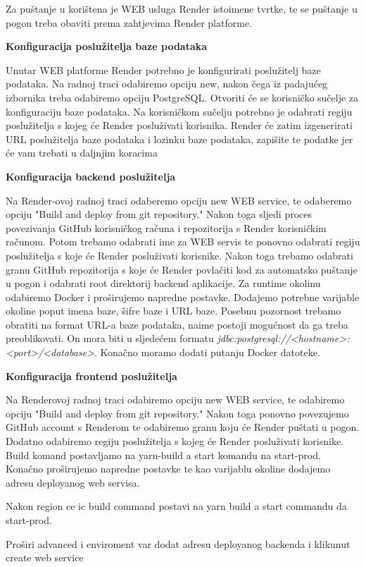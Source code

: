 			Za puštanje u korištena je WEB usluga Render istoimene tvrtke, te se puštanje u pogon treba obaviti prema zahtjevima Render platforme. 
			 	
			 \textbf{Konfiguracija poslužitelja baze podataka}
			 
			 Unutar WEB platforme Render potrebno je konfigurirati poslužitelj baze podataka. Na radnoj traci odabiremo opciju new, nakon čega iz padajućeg izbornika treba odabiremo opciju PostgreSQL. Otvoriti će se korisničko sučelje za konfiguraciju baze podataka. Na korisničkom sučelju potrebno je odabrati regiju poslužitelja s kojeg će Render posluživati korisnika. Render će zatim izgenerirati URL poslužitelja baze podataka i lozinku baze podataka, zapišite te podatke jer će vam trebati u daljnjim koracima  
			 
			 
			 	
			 \textbf{Konfiguracija backend poslužitelja}
			 
			 Na Render-ovoj radnoj traci odaberemo opciju new WEB service, te odaberemo opciju "Build and deploy from git repository." Nakon toga sljedi proces povezivanja GitHub korisničkog računa i repozitorija s Render korisničkim računom. Potom trebamo odabrati ime za WEB servis te ponovno odabrati regiju poslužitelja s koje će Render posluživati korisnike.
			 Nakon toga trebamo odabrati granu GitHub repozitorija s koje će Render povlačiti kod za automatsko puštanje u pogon i odabrati root direktorij backend aplikacije. Za runtime okolinu odabiremo Docker i proširujemo napredne postavke. Dodajemo potrebne varijable okoline poput imena baze, šifre baze i URL baze. Posebnu pozornost trebamo obratiti na format URL-a baze podataka, naime postoji mogućnost da ga treba preoblikovati. On mora biti u sljedećem formatu \textit{jdbc:postgresql://<hostname>:<port>/<database>}. Konačno moramo dodati putanju Docker datoteke.
			 
			\textbf{Konfiguracija frontend poslužitelja}
			
			
			 Na Renderovoj radnoj traci odabiremo opciju new WEB service, te odabiremo opciju "Build and deploy from git repository." Nakon toga ponovno povezujemo GitHub account s Renderom te odabiremo granu koju će Render puštati u pogon. Dodatno odabiremo regiju poslužitelja s kojeg će Render posluživati korisnike. Build komand postavljamo na yarn-build a start komandu na start-prod. Konačno proširujemo napredne postavke te kao varijablu okoline dodajemo adresu deployanog web servisa.
			 
			 
			 
			 
			 Nakon region ce ic build command postavi na yarn build a start commandu da start-prod. 
			 
			 Proširi advanced i enviroment var dodat adresu deployanog backenda i klikunut create web service
			 
			 
			 
			 
			 	
			 		
			
			
			\eject 